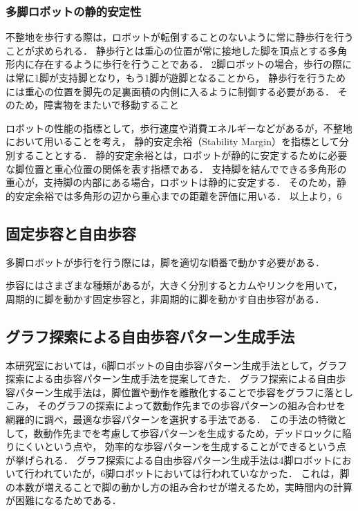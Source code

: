 \subsubsection{多脚ロボットの静的安定性}
不整地を歩行する際は，ロボットが転倒することのないように常に静歩行を行うことが求められる．
静歩行とは重心の位置が常に接地した脚を頂点とする多角形内に存在するように歩行を行うことである．
2脚ロボットの場合，歩行の際には常に1脚が支持脚となり，もう1脚が遊脚となることから，
静歩行を行うためには重心の位置を脚先の足裏面積の内側に入るように制御する必要がある．
そのため，障害物をまたいで移動すること

ロボットの性能の指標として，歩行速度や消費エネルギーなどがあるが，不整地において用いることを考え，
静的安定余裕\cite{Hirose_Static_stability_criterion}（Stability Margin）を指標として分別することとする．
静的安定余裕とは，ロボットが静的に安定するために必要な脚位置と重心位置の関係を表す指標である．
支持脚を結んでできる多角形の重心が，支持脚の内部にある場合，ロボットは静的に安定する．
そのため，静的安定余裕では多角形の辺から重心までの距離を評価に用いる．
以上より，6

\subsection{固定歩容と自由歩容}
多脚ロボットが歩行を行う際には，脚を適切な順番で動かす必要がある．

歩容にはさまざまな種類があるが，大きく分別するとカムやリンクを用いて，
周期的に脚を動かす固定歩容と，非周期的に脚を動かす自由歩容がある．

\subsection{グラフ探索による自由歩容パターン生成手法}

本研究室においては，6脚ロボットの自由歩容パターン生成手法として，グラフ探索による由歩容パターン生成手法を提案してきた．
グラフ探索による自由歩容パターン生成手法は，脚位置や動作を離散化することで歩容をグラフに落としこみ，
そのグラフの探索によって数動作先までの歩容パターンの組み合わせを網羅的に調べ，最適な歩容パターンを選択する手法である．
この手法の特徴として，数動作先までを考慮して歩容パターンを生成するため，デッドロックに陥りにくいという点や，
効率的な歩容パターンを生成することができるという点が挙げられる．
グラフ探索による自由歩容パターン生成手法は4脚ロボットにおいて行われていたが\cite{Prabir_Graph_search}，6脚ロボットにおいては行われていなかった．
これは，脚の本数が増えることで脚の動かし方の組み合わせが増えるため，実時間内の計算が困難になるためである．


